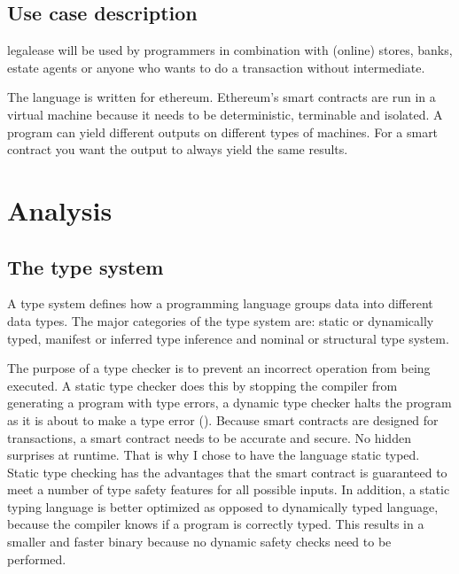 \documentclass{uva-inf-article}
\begin{document}
\subsection{Use case description}
legalease will be used by programmers in combination with (online) stores, banks, estate agents or anyone 
who wants to do a transaction without intermediate.
\vspace{5mm}

The language is written for ethereum. Ethereum's smart contracts are run in a virtual machine because 
it needs to be deterministic, terminable and isolated.
A program can yield different outputs on different types of machines.
For a smart contract you want the output to always yield the same results.

\newpage
\section{Analysis}
\subsection{The type system}
\par A type system defines how a programming language groups data into different data types.
The major categories of the type system are: static or dynamically typed, manifest or inferred 
type inference and nominal or structural type system.
\vspace{5mm}

\par The purpose of a type checker is to prevent an incorrect operation from being executed.
A static type checker does this by stopping the compiler from generating a program with type errors, 
a dynamic type checker halts the program as it is about to make a type error (\cite{matthews1987static}).
Because smart contracts are designed for transactions, a smart contract needs to be accurate and secure. 
No hidden surprises at runtime.
That is why I chose to have the language static typed.
Static type checking has the advantages that the smart contract is guaranteed to meet a number of type safety features for all possible inputs.
In addition, a static typing language is better optimized as opposed to dynamically typed language, because the compiler knows if a program is correctly typed.
This results in a smaller and faster binary because no dynamic safety checks need to be performed.
\vspace{5mm}
\end{document}
